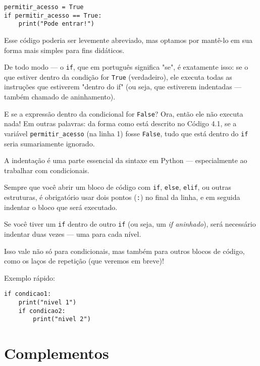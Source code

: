 \documentclass[12pt]{book}
\begin{document}
	\begin{lstlisting}[caption={Estrutura condicional simples}]
permitir_acesso = True
if permitir_acesso == True:
	print("Pode entrar!")\end{lstlisting}
	
	Esse código poderia ser levemente abreviado, mas optamos por mantê-lo em sua forma mais simples para fins didáticos.
	
	De todo modo — o \texttt{if}, que em português significa "se", é exatamente isso: se o que estiver dentro da condição for \verb*|True| (verdadeiro), ele executa todas as instruções que estiverem "dentro do if" (ou seja, que estiverem indentadas — também chamado de aninhamento).
	
	E se a expressão dentro da condicional for \verb*|False|? Ora, então ele não executa nada! Em outras palavras: da forma como está descrito no Código 4.1, se a variável \verb*|permitir_acesso| (na linha 1) fosse \verb*|False|, tudo que está dentro do \texttt{if} seria sumariamente ignorado.
	
	\begin{tcolorbox}[colback=gray!10, colframe=black, title={\large\bfseries Observação}]
		A indentação é uma parte essencial da sintaxe em Python — especialmente ao trabalhar com condicionais.
		
		Sempre que você abrir um bloco de código com \verb|if|, \verb|else|, \verb|elif|, ou outras estruturas, é obrigatório usar dois pontos (\texttt{:}) no final da linha, e em seguida indentar o bloco que será executado.
		
		Se você tiver um \verb|if| dentro de outro \verb|if| (ou seja, um \textit{if aninhado}), será necessário indentar duas vezes — uma para cada nível.
		
		Isso vale não só para condicionais, mas também para outros blocos de código, como os laços de repetição (que veremos em breve)!
		
		\vspace{0.5em}
		Exemplo rápido:
	\begin{lstlisting}[caption={Condicionais aninhadas}]
if condicao1:
	print("nivel 1")
	if condicao2:
		print("nivel 2")
		\end{lstlisting}
	\end{tcolorbox}

	\section{Complementos}
	
\end{document}
